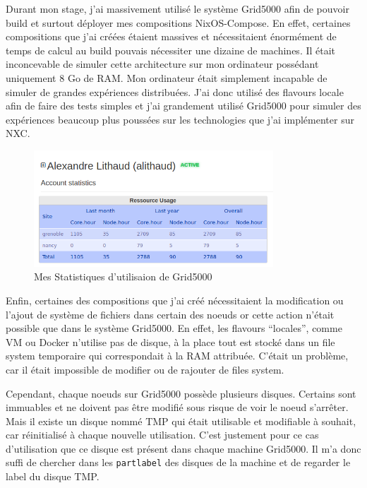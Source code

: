\documentclass[a4paper,french,12pt, titlepage]{article}
\begin{document}
Durant mon stage, j'ai massivement utilisé le système Grid5000 afin de
pouvoir build et surtout déployer mes compositions NixOS-Compose. En
effet, certaines compositions que j'ai créées étaient massives et
nécessitaient énormément de temps de calcul au build pouvais nécessiter
une dizaine de machines. Il était inconcevable de simuler cette
architecture sur mon ordinateur possédant uniquement 8 Go de RAM. Mon
ordinateur était simplement incapable de simuler de grandes expériences
distribuées. J'ai donc utilisé des flavours locale afin de faire des
tests simples et j'ai grandement utilisé Grid5000 pour simuler des
expériences beaucoup plus poussées sur les technologies que j'ai
implémenter sur NXC.\newline

\begin{figure}[h]
\centering
\includegraphics[width=0.8\textwidth,height=0.8\textheight,keepaspectratio]{images/statg5k.png}
\caption{Mes Statistiques d'utilisaion de Grid5000}
\end{figure}

Enfin, certaines des compositions que j'ai créé nécessitaient la
modification ou l'ajout de système de fichiers dans certain des noeuds
or cette action n'était possible que dans le système Grid5000. En effet,
les flavours ``locales'', comme VM ou Docker n'utilise pas de disque, à
la place tout est stocké dans un file system temporaire qui
correspondait à la RAM attribuée. C'était un problème, car il était
impossible de modifier ou de rajouter de files system.

Cependant, chaque noeuds sur Grid5000 possède plusieurs disques.
Certains sont immuables et ne doivent pas être modifié sous risque de
voir le noeud s'arrêter. Mais il existe un disque nommé TMP qui était
utilisable et modifiable à souhait, car réinitialisé à chaque nouvelle
utilisation. C'est justement pour ce cas d'utilisation que ce disque est
présent dans chaque machine Grid5000. Il m'a donc suffi de chercher dans
les \texttt{partlabel} des disques de la machine et de regarder le label
du disque TMP.\newline
\end{document}
